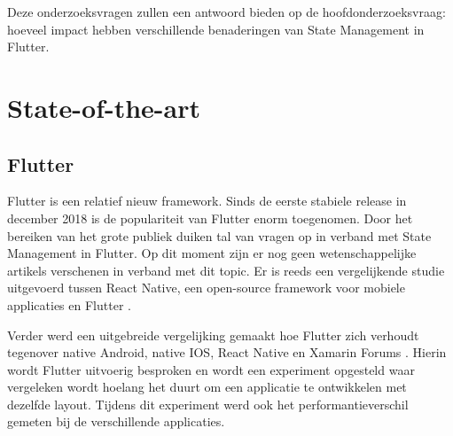 Deze onderzoeksvragen zullen een antwoord bieden op de hoofdonderzoeksvraag: hoeveel impact hebben verschillende benaderingen van State Management in Flutter.


\section{State-of-the-art}
\label{sec:state-of-the-art}
\subsection*{Flutter}
Flutter is een relatief nieuw framework. Sinds de eerste stabiele release in december 2018 is de populariteit
van Flutter enorm toegenomen. Door het bereiken van het grote publiek duiken tal van vragen op in verband met 
State Management in Flutter. Op dit moment zijn er nog geen wetenschappelijke artikels verschenen in verband met dit topic.
Er is reeds een vergelijkende studie uitgevoerd tussen React Native, een open-source framework voor mobiele applicaties en Flutter \autocite{Wu2018}.

Verder werd een uitgebreide vergelijking gemaakt hoe Flutter zich verhoudt tegenover native Android, native IOS,
React Native en Xamarin Forums \autocite{Coninck2019}.
Hierin wordt Flutter uitvoerig besproken en wordt een experiment opgesteld waar vergeleken wordt hoelang het duurt
om een applicatie te ontwikkelen met dezelfde layout. Tijdens dit experiment werd ook het performantieverschil gemeten bij de verschillende applicaties. 

%


